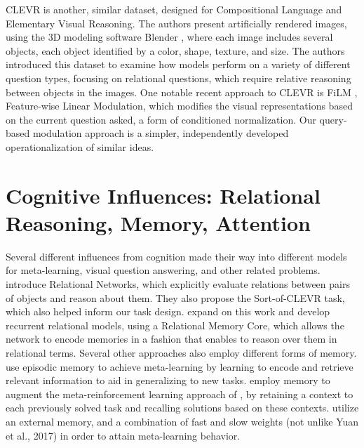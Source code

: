 CLEVR \parencite{Johnson2017} is another, similar dataset, designed for Compositional Language and Elementary Visual Reasoning. The authors present artificially rendered images, using the 3D modeling software Blender \parencite{BlenderOnlineCommunity2018}, where each image includes several objects, each object identified by a color, shape, texture, and size. The authors introduced this dataset to examine how models perform on a variety of different question types, focusing on relational questions, which require relative reasoning between objects in the images. One notable recent approach to CLEVR is FiLM \parencite{Perez2017,Dumoulin2018}, Feature-wise Linear Modulation, which modifies the visual representations based on the current question asked, a form of conditioned normalization. Our query-based modulation approach is a simpler, independently developed operationalization of similar ideas.

\section{Cognitive Influences: Relational Reasoning, Memory, Attention}
Several different influences from cognition made their way into different models for meta-learning, visual question answering, and other related problems. \textcite{Santoro} introduce Relational Networks, which explicitly evaluate relations between pairs of objects and reason about them. They also propose the Sort-of-CLEVR task, which also helped inform our task design. \textcite{Santoro2018} expand on this work and develop recurrent relational models, using a Relational Memory Core, which allows the network to encode memories in a fashion that enables to reason over them in relational terms. Several other approaches also employ different forms of memory. \textcite{Santoro2016} use episodic memory to achieve meta-learning by learning to encode and retrieve relevant information to aid in generalizing to new tasks. \textcite{Ritter2018} employ memory to augment the meta-reinforcement learning approach of \textcite{Wang2016}, by retaining a context to each previously solved task and recalling solutions based on these contexts. \textcite{Munkhdalai2018} utilize an external memory, and a combination of fast and slow weights (not unlike Yuan et al., 2017) in order to attain meta-learning behavior. 

